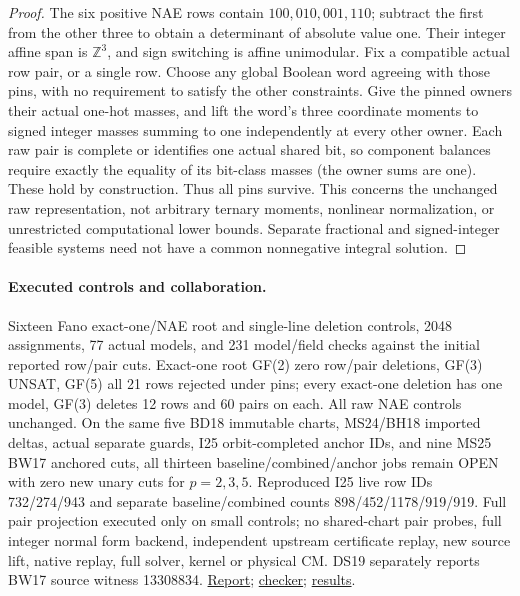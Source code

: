 \documentclass[11pt]{article}
\begin{document}
\begin{proof}
The six positive NAE rows contain $100,010,001,110$; subtract the first from the other three to obtain a determinant of absolute value one. Their integer affine span is $\mathbb Z^3$, and sign switching is affine unimodular. Fix a compatible actual row pair, or a single row. Choose any global Boolean word agreeing with those pins, with no requirement to satisfy the other constraints. Give the pinned owners their actual one-hot masses, and lift the word's three coordinate moments to signed integer masses summing to one independently at every other owner. Each raw pair is complete or identifies one actual shared bit, so component balances require exactly the equality of its bit-class masses (the owner sums are one). These hold by construction. Thus all pins survive. This concerns the unchanged raw representation, not arbitrary ternary moments, nonlinear normalization, or unrestricted computational lower bounds. Separate fractional and signed-integer feasible systems need not have a common nonnegative integral solution.
\end{proof}
\paragraph{Executed controls and collaboration.}
Sixteen Fano exact-one/NAE root and single-line deletion controls, 2048 assignments, 77 actual models, and 231 model/field checks against the initial reported row/pair cuts. Exact-one root GF(2) zero row/pair deletions, GF(3) UNSAT, GF(5) all 21 rows rejected under pins; every exact-one deletion has one model, GF(3) deletes 12 rows and 60 pairs on each. All raw NAE controls unchanged. On the same five BD18 immutable charts, MS24/BH18 imported deltas, actual separate guards, I25 orbit-completed anchor IDs, and nine MS25 BW17 anchored cuts, all thirteen baseline/combined/anchor jobs remain OPEN with zero new unary cuts for $p=2,3,5$. Reproduced I25 live row IDs 732/274/943 and separate baseline/combined counts 898/452/1178/919/919. Full pair projection executed only on small controls; no shared-chart pair probes, full integer normal form backend, independent upstream certificate replay, new source lift, native replay, full solver, kernel or physical CM. DS19 separately reports BW17 source witness 13308834. \href{https://github.com/j15marti/pnp/commit/71ceb74b07fb0eee872f29842ddf1a51691a4849}{Report}; \href{https://github.com/j15marti/pnp/commit/a29cb74de59dd0e311d4b07c2be597b30948cb56}{checker}; \href{https://github.com/j15marti/pnp/commit/2e574d179a777e57d77b2480025e2cea970d5664}{results}.
\end{document}
